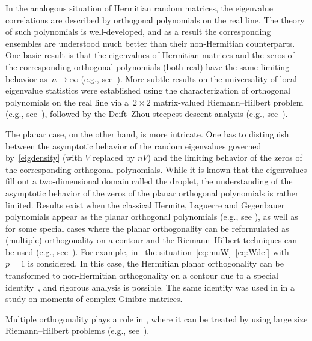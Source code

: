 \documentclass[pdftex]{sigma}
\numberwithin{equation}{section}
\begin{document}

 In the analogous situation of Hermitian random matrices, the eigenvalue correlations are described by orthogonal polynomials on the real line. The theory of such polynomials is well-developed, and as a result the corresponding ensembles are understood much better than their non-Hermitian counterparts. One basic result is that the eigenvalues of Hermitian matrices and the zeros of the corresponding orthogonal polynomials (both real) have the same limiting behavior as~$n \to \infty$ (e.g., see~\cite{Deif}). More subtle results on the universality of local eigenvalue statistics were established using the characterization of orthogonal polynomials on the real line via a~$2\times2$ matrix-valued Riemann--Hilbert problem (e.g., see~\cite{FIK2}), followed by the Deift--Zhou steepest descent analysis (e.g., see~\cite{DKMVZ,DZ}).

 The planar case, on the other hand, is more intricate. One has to distinguish between the asymptotic behavior of the random eigenvalues governed by~\eqref{eigdensity} (with $V$ replaced by $nV$) and the limiting behavior of the zeros of the corresponding orthogonal polynomials.
 While it is known that the eigenvalues fill out a two-dimensional domain called the droplet, the understanding of the asymptotic behavior of the zeros of the planar orthogonal polynomials is rather limited.
 Results exist when the classical Hermite, Laguerre and Gegenbauer polynomials appear as the planar orthogonal polynomials
 (e.g., see \cite{ANPV,Karp,EM}), as well as for some special cases where the planar orthogonality can be reformulated as
 (multiple) orthogonality on a contour and the Riemann--Hilbert techniques can be used
 (e.g., see~\cite{BBLM,BGM,BEG,BK,DS,LY1}). For example, in~\cite{BBLM} the situation~\eqref{eq:muW}--\eqref{eq:Wdef}
 with $p=1$ is considered. In this case,
 the Hermitian planar orthogonality can be transformed to non-Hermitian orthogonality
 on a contour due to a special identity~\cite[Lemma 3.1]{BBLM}, and rigorous analysis
 is possible. The same identity was used in \cite{WW} in a study on moments of complex Ginibre matrices.

 Multiple orthogonality plays a role in \cite{BK,LY1,LY3}, where it can be treated by using large size Riemann--Hilbert problems (e.g., see~\cite{VAGK}).
\end{document}
